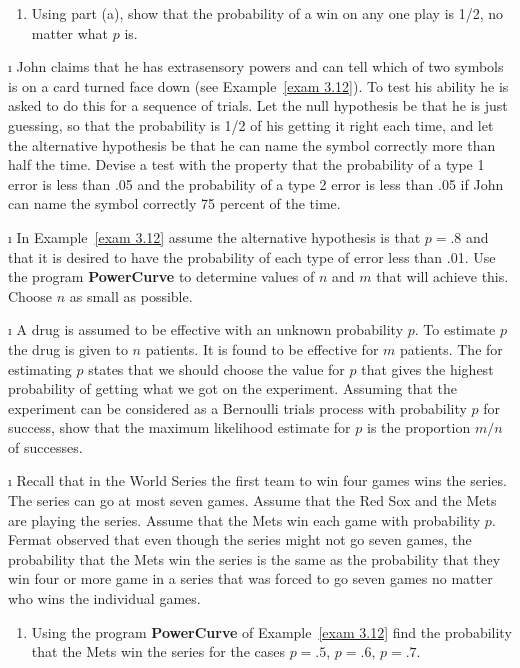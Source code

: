 \begin{LJSItem}
\begin{enumerate}
\item Using part (a), show that the probability of a win on any one play is 1/2,  no
matter what $p$ is.
\end{enumerate}

\i\label{exer 3.2.27} John claims that he has extrasensory powers and can tell
which of two symbols is on a card turned face down (see Example~\ref{exam 3.12}).   
To test his ability he is asked to do this for a sequence of trials. 
Let the null hypothesis be that he is just guessing, so that the probability is 1/2 of
his getting it right each time, and let the alternative hypothesis be that he can name
the symbol correctly more than half the time.  Devise a test with the property that
the probability of a type 1 error is less than .05 and the probability of a type 2
error is less than .05 if John can name the symbol correctly 75 percent of the time.

\i\label{exer 3.2.28} In Example~\ref{exam 3.12}  assume the alternative hypothesis
is that $p = .8$ and that it is desired to have the probability of each type of error
less than .01.  Use the program {\bf PowerCurve} to determine values of $n$ and $m$ that
will achieve this.  Choose $n$ as small as possible.

\i\label{exer 3.2.29} A drug is assumed to be effective with an unknown probability
$p$.  To estimate $p$ the drug is given to $n$ patients.  It is found to be effective
for $m$ patients.  The  
for estimating $p$ states that we should choose the value for $p$ that gives the 
highest probability of getting what we got on the experiment.  Assuming that the experiment 
can be considered as a Bernoulli trials process with probability $p$ for success, show 
that the maximum likelihood estimate for $p$ is the proportion $m/n$ of successes.

\i\label{exer 3.2.30} Recall that in the World Series the first team to win four
games wins the series.  The series can go at most seven games.  Assume that the Red
Sox and the Mets are playing the series.  Assume that the Mets win each game with
probability $p$.  Fermat observed that even though the series might not go seven
games, the probability that the Mets win the series is the same as the probability
that they win four or more game in a series that was forced to go seven games no
matter who wins the individual games.

\begin{enumerate}
\item Using the program {\bf PowerCurve} of Example~\ref{exam 3.12}  find the probability
that the Mets win the series for the cases $p = .5$, $p = .6$, $p =.7$.


\end{enumerate}
\end{LJSItem}
